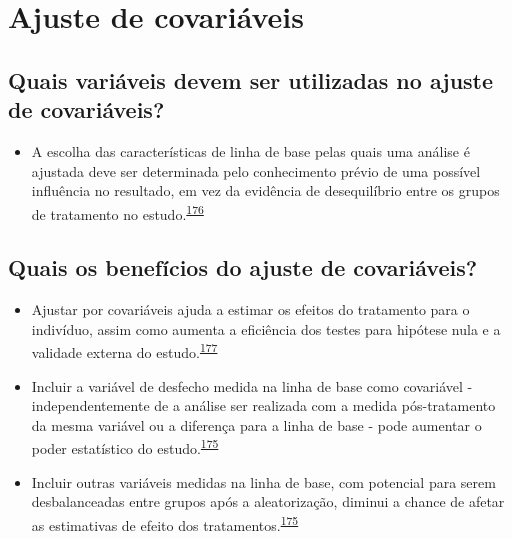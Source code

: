 \documentclass[
  a4paper,
]{book}
\providecommand{\tightlist}{%
  \setlength{\itemsep}{0pt}\setlength{\parskip}{0pt}}
\begin{document}
\hypertarget{ajuste-de-covariaveis}{%
\section{Ajuste de covariáveis}\label{ajuste-de-covariaveis}}

\hypertarget{quais-variuxe1veis-devem-ser-utilizadas-no-ajuste-de-covariuxe1veis}{%
\subsection{Quais variáveis devem ser utilizadas no ajuste de covariáveis?}\label{quais-variuxe1veis-devem-ser-utilizadas-no-ajuste-de-covariuxe1veis}}

\begin{itemize}
\tightlist
\item
  A escolha das características de linha de base pelas quais uma análise é ajustada deve ser determinada pelo conhecimento prévio de uma possível influência no resultado, em vez da evidência de desequilíbrio entre os grupos de tratamento no estudo.\textsuperscript{\protect\hyperlink{ref-roberts1999}{176}}
\end{itemize}

\hypertarget{quais-os-benefuxedcios-do-ajuste-de-covariuxe1veis}{%
\subsection{Quais os benefícios do ajuste de covariáveis?}\label{quais-os-benefuxedcios-do-ajuste-de-covariuxe1veis}}

\begin{itemize}
\item
  Ajustar por covariáveis ajuda a estimar os efeitos do tratamento para o indivíduo, assim como aumenta a eficiência dos testes para hipótese nula e a validade externa do estudo.\textsuperscript{\protect\hyperlink{ref-Hauck1998}{177}}
\item
  Incluir a variável de desfecho medida na linha de base como covariável - independentemente de a análise ser realizada com a medida pós-tratamento da mesma variável ou a diferença para a linha de base - pode aumentar o poder estatístico do estudo.\textsuperscript{\protect\hyperlink{ref-Kahan2014}{175}}
\item
  Incluir outras variáveis medidas na linha de base, com potencial para serem desbalanceadas entre grupos após a aleatorização, diminui a chance de afetar as estimativas de efeito dos tratamentos.\textsuperscript{\protect\hyperlink{ref-Kahan2014}{175}}
\end{itemize}
\end{document}
